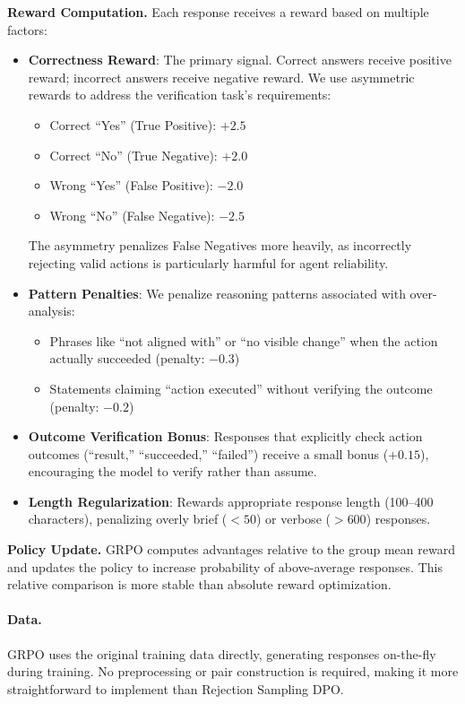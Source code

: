 \documentclass[11pt,a4paper]{article}
\begin{document}
\textbf{Reward Computation.} Each response receives a reward based on multiple factors:
\begin{itemize}
    \item \textbf{Correctness Reward}: The primary signal. Correct answers receive positive reward; incorrect answers receive negative reward. We use asymmetric rewards to address the verification task's requirements:
    \begin{itemize}
        \item Correct ``Yes'' (True Positive): $+2.5$
        \item Correct ``No'' (True Negative): $+2.0$
        \item Wrong ``Yes'' (False Positive): $-2.0$
        \item Wrong ``No'' (False Negative): $-2.5$
    \end{itemize}
    The asymmetry penalizes False Negatives more heavily, as incorrectly rejecting valid actions is particularly harmful for agent reliability.
    
    \item \textbf{Pattern Penalties}: We penalize reasoning patterns associated with over-analysis:
    \begin{itemize}
        \item Phrases like ``not aligned with'' or ``no visible change'' when the action actually succeeded (penalty: $-0.3$)
        \item Statements claiming ``action executed'' without verifying the outcome (penalty: $-0.2$)
    \end{itemize}
    
    \item \textbf{Outcome Verification Bonus}: Responses that explicitly check action outcomes (``result,'' ``succeeded,'' ``failed'') receive a small bonus ($+0.15$), encouraging the model to verify rather than assume.
    
    \item \textbf{Length Regularization}: Rewards appropriate response length (100--400 characters), penalizing overly brief ($<50$) or verbose ($>600$) responses.
\end{itemize}

\textbf{Policy Update.} GRPO computes advantages relative to the group mean reward and updates the policy to increase probability of above-average responses. This relative comparison is more stable than absolute reward optimization.

\paragraph{Data.} GRPO uses the original training data directly, generating responses on-the-fly during training. No preprocessing or pair construction is required, making it more straightforward to implement than Rejection Sampling DPO.
\end{document}
